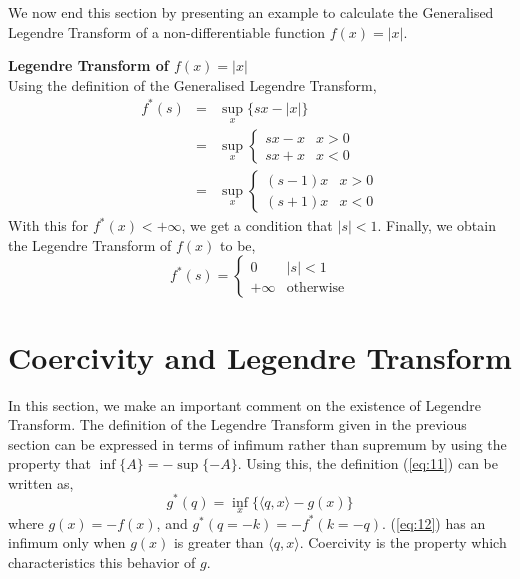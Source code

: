 \noindent
We now end this section by presenting an example to calculate the
Generalised Legendre Transform of a non-differentiable function $f(x)
= \lvert x \rvert$.
\begin{example}
  \textbf{Legendre Transform of $f(x) = \lvert x \rvert$}\\

  \noindent
  Using the definition of the Generalised Legendre Transform,
  \begin{eqnarray}
    f^*(s) &=& \sup_{x}\{sx - \lvert x \rvert\}\\
    &=& \sup_{x} \left\{
      \begin{array}{ll}
        sx - x & x > 0\\
        sx + x & x < 0
      \end{array}
                 \right.\\
    &=& \sup_{x} \left\{
      \begin{array}{ll}
        (s-1)x & x > 0\\
        (s+1)x & x < 0
      \end{array}
    \right.
  \end{eqnarray}
  With this for $f^*(x) < +\infty$, we get a condition that $\lvert s
  \rvert < 1$. Finally, we obtain the Legendre Transform of $f(x)$ to
  be,
  \begin{equation}
     f^*(s) = \left\{
      \begin{array}{ll}
        0 & \lvert s \rvert < 1\\
        +\infty & \text{otherwise}
      \end{array}
    \right.
  \end{equation}
\end{example}

\section{Coercivity and Legendre Transform}
In this section, we make an important comment on the existence of
Legendre Transform. The definition of the Legendre Transform given in
the previous section can be expressed in terms of infimum rather than
supremum by using the property that $\inf\{A\} = -\sup\{-A\}$. Using
this, the definition (\ref{eq:11}) can be written as,
\begin{equation}
  g^*(q) = \inf_{x}\{\langle q,x \rangle - g(x)\}\label{eq:12}
\end{equation}
where $g(x) = -f(x)$, and $g^*(q = -k) = -f^*(k = -q)$. (\ref{eq:12})
has an infimum only when $g(x)$ is greater than $\langle q,x
\rangle$. Coercivity is the property which characteristics this
behavior of $g$.

